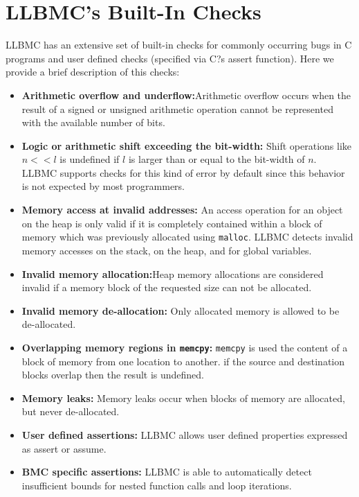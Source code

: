 \documentclass[14pt]{article}
\begin{document}
{\section{LLBMC's Built-In Checks}\label{LLBMC?s Built-In Checks} LLBMC has an extensive set of built-in checks for commonly occurring bugs in C programs and user defined checks (specified via C?s assert function). Here we provide a brief description of this checks:
\begin{itemize}
  \item \textbf{Arithmetic overflow and underflow:}Arithmetic overflow occurs when the result of a signed or unsigned arithmetic operation cannot be represented with the available number of bits.
\item \textbf{Logic or arithmetic shift exceeding the bit-width:} Shift operations like  \(n << l\)  is undefined if  \(l \) is larger than or equal to the bit-width of  \(n\). LLBMC supports checks for this kind of error by default since this behavior is not expected by most programmers.
\item \textbf{Memory access at invalid addresses:} An access operation for an object on the heap is only valid if it is completely contained within a block of memory which was previously allocated using \texttt{malloc}. LLBMC detects invalid memory accesses on the stack, on the heap, and for global variables.
\item \textbf{Invalid memory allocation:}Heap memory allocations are considered invalid if a memory block of the requested size can not be allocated. 
\item \textbf{Invalid memory de-allocation:} Only allocated memory is allowed to be de-allocated.
\item \textbf{Overlapping memory regions in \texttt{memcpy}:}  \texttt{memcpy} is used the content of a block of memory from one location to another. if the source and destination blocks overlap then the result is undefined.
\item \textbf{Memory leaks:} Memory leaks occur when blocks of memory are allocated, but never de-allocated.
\item \textbf{User defined assertions:} LLBMC allows user defined properties expressed as assert or assume. 
\item \textbf{BMC specific assertions:} LLBMC is able to automatically detect insufficient bounds for nested function calls and loop iterations.

\end{itemize}


}
\end{document}

